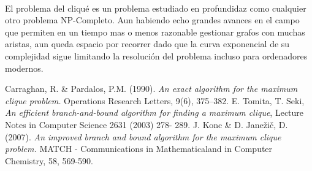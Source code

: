 \documentclass{article}
\begin{document}
\paragraph{} El problema del cliqué es un problema estudiado en profundidaz como cualquier otro problema NP-Completo. Aun habiendo echo grandes avances en el campo que permiten en un tiempo mas o menos razonable gestionar grafos con muchas aristas, aun queda espacio por recorrer dado que la curva exponencial de su complejidad sigue limitando la resolución del problema incluso para ordenadores modernos.
\begin{thebibliography}{9}
 Carraghan, R. \& Pardalos, P.M. (1990). \textit{An exact algorithm for the maximum clique problem.} Operations Research Letters, 9(6), 375–382.
 E. Tomita, T. Seki, \textit{An efficient branch-and-bound algorithm for finding
a maximum clique}, Lecture Notes in Computer Science 2631 (2003) 278-
289.
 J. Konc \& D. Janežič, D. (2007). \textit{An improved branch and bound algorithm for the maximum clique problem.} MATCH - Communications in Mathematicaland in Computer Chemistry, 58, 569-590.
\end{thebibliography}
\appendix
\end{document}
